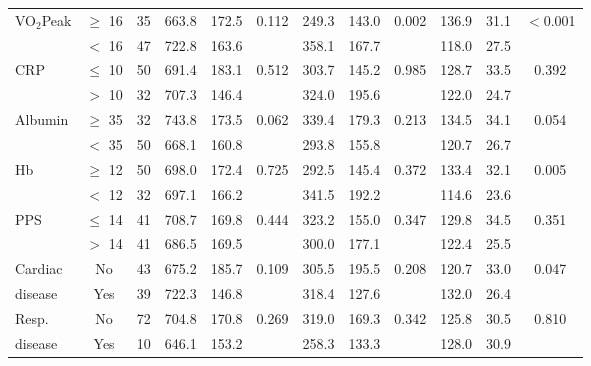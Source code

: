 \begin{sidewaystable}[p]
\begin{tabular}{|l c c | c c c | c c c | c c c|}
		VO$_2$Peak & $\geq$ 16 & 35 & 663.8 & 172.5 & 0.112    & 249.3 & 143.0 & 0.002    & 136.9 & 31.1 & $<$0.001 \\
		           & $<$ 16    & 47 & 722.8 & 163.6 &          & 358.1 & 167.7 &          & 118.0 & 27.5 &  \\
		CRP        & $\leq$ 10 & 50 & 691.4 & 183.1 & 0.512    & 303.7 & 145.2 & 0.985    & 128.7 & 33.5 & 0.392    \\
		           & $>$ 10    & 32 & 707.3 & 146.4 &          & 324.0 & 195.6 &          & 122.0 & 24.7 &  \\
		Albumin    & $\geq$ 35 & 32 & 743.8 & 173.5 & 0.062    & 339.4 & 179.3 & 0.213    & 134.5 & 34.1 & 0.054    \\
		           & $<$ 35    & 50 & 668.1 & 160.8 &          & 293.8 & 155.8 &          & 120.7 & 26.7 &  \\
		Hb         & $\geq$ 12 & 50 & 698.0 & 172.4 & 0.725    & 292.5 & 145.4 & 0.372    & 133.4 & 32.1 & 0.005    \\
		           & $<$ 12    & 32 & 697.1 & 166.2 &          & 341.5 & 192.2 &          & 114.6 & 23.6 &  \\
		PPS        & $\leq$ 14 & 41 & 708.7 & 169.8 & 0.444    & 323.2 & 155.0 & 0.347    & 129.8 & 34.5 & 0.351    \\
		           & $>$ 14    & 41 & 686.5 & 169.5 &          & 300.0 & 177.1 &          & 122.4 & 25.5 &  \\
		Cardiac    & No        & 43 & 675.2 & 185.7 & 0.109    & 305.5 & 195.5 & 0.208    & 120.7 & 33.0 & 0.047    \\
		disease    & Yes       & 39 & 722.3 & 146.8 &          & 318.4 & 127.6 &          & 132.0 & 26.4 &  \\
		Resp.      & No        & 72 & 704.8 & 170.8 & 0.269    & 319.0 & 169.3 & 0.342    & 125.8 & 30.5 & 0.810    \\
		disease    & Yes       & 10 & 646.1 & 153.2 &          & 258.3 & 133.3 &          & 128.0 & 30.9 &  \\ \hline
	\end{tabular}
\end{sidewaystable}